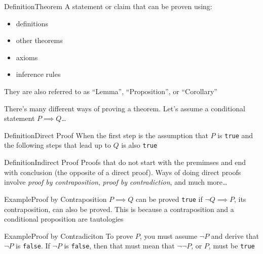 \documentclass{MathNotes}
\newenvironment{example}[1]{\begin{BlueBox}{Example}{#1}}{\end{BlueBox}}
\newenvironment{definition}[1]{\begin{RedBox}{Definition}{#1}}{\end{RedBox}}
\begin{document}
\begin{definition}{Theorem}\label{def:theorem}
	A statement or claim that can be proven using:
	\begin{itemize}
		\item definitions
		\item other theorems
		\item axioms
		\item inference rules
	\end{itemize}
	They are also referred to as ``Lemma'', ``Proposition'', or ``Corollary''
\end{definition}
There's many different ways of proving a theorem. Let's assume a conditional statement $P\implies Q$\ldots
\begin{multicols}{2}
	\begin{definition}{Direct Proof}\label{def:direct-proof}
		When the first step is the assumption that $P$ is
		\texttt{true} and the following steps that lead up to $Q$ is also \texttt{true}
	\end{definition}

	\begin{definition}{Indirect Proof}\label{def:indirect-proof}
		Proofs that do not start with the premimses and end with conclusion (the opposite of a direct proof). Ways of doing direct proofs involve \textit{proof by contraposition}, \textit{proof by contradiction}, and much more\ldots
	\end{definition}

	\begin{example}{Proof by Contraposition}\label{ex:contraposition-proof}
		$P\implies Q$ can be proved \texttt{true} if $\lnot Q\implies P$, its contraposition, can also be proved. This is because a contraposition and a conditional proposition are tautologies
	\end{example}

	\begin{example}{Proof by Contradiciton}\label{ex:contradiciton-proof}
		To prove $P$, you must assume $\lnot P$ and derive that $\lnot P$ is \texttt{false}. If $\lnot P$ is \texttt{false}, then that must mean that $\lnot\lnot P$, or $P$, must be \texttt{true}
	\end{example}
\end{multicols}

\newpage
\end{document}

